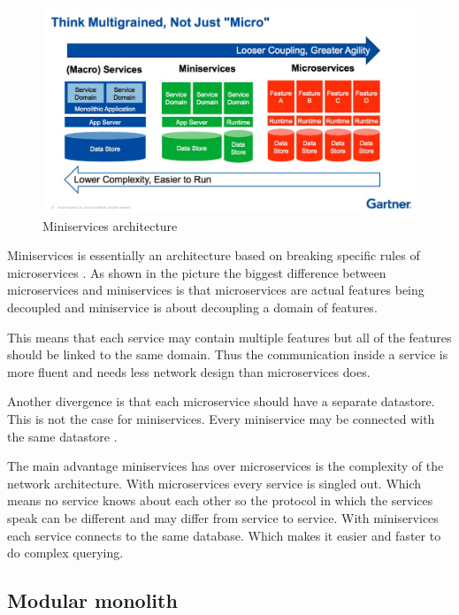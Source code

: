 \begin{figure}[H]
	\includegraphics[width=\linewidth]{miniservices.png}
        \caption{Miniservices architecture \cite{miniservicesDefinition}}
        \label{fig:MiniservicesArchitecture}
\end{figure}

Miniservices is essentially an architecture based on breaking specific rules of microservices \cite{miniservicesOrigin}. As shown in the picture the biggest difference between microservices and miniservices is that microservices are actual features being decoupled and miniservice is about decoupling a domain of features.

This means that each service may contain multiple features but all of the features should be linked to the same domain. Thus the communication inside a service is more fluent and needs less network design than microservices does.

Another divergence is that each microservice should have a separate datastore. This is not the case for miniservices. Every miniservice may be connected with the same datastore \cite{miniservicesDefinition}.

The main advantage miniservices has over microservices is the complexity of the network architecture. With microservices every service is singled out. Which means no service knows about each other so the protocol in which the services speak can be different and may differ from service to service. With miniservices each service connects to the same database. Which makes it easier and faster to do complex querying.

\subsection{Modular monolith}
\label{sec:ModularMonolith}

